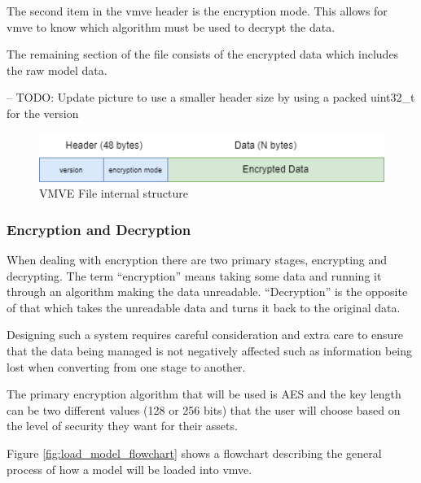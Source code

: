 \documentclass[11pt]{article}
\begin{document}
The second item in the \gls*{vmve} header is the encryption mode. This allows for
\gls*{vmve} to know which algorithm must be used to decrypt the data.

The remaining section of the file consists of the encrypted data which includes
the raw model data.

-- TODO: Update picture to use a smaller header size by using a packed uint32\_t for the version

\begin{figure}[ht]
  \centering
  \includegraphics[width=\textwidth]{images/vmve_file_structure.png}
  \caption{VMVE File internal structure}
  \label{fig:vmve_file_structure}
\end{figure}


\subsubsection{Encryption and Decryption}
When dealing with encryption there are two primary stages, encrypting and
decrypting. The term ``encryption'' means taking some data and running it
through an algorithm making the data unreadable. ``Decryption'' is the opposite
of that which takes the unreadable data and turns it back to the original data.

Designing such a system requires careful consideration and extra care to ensure
that the data being managed is not negatively affected such as information being
lost when converting from one stage to another.

The primary encryption algorithm that will be used is AES and the key length can
be two different values (128 or 256 bits) that the user will choose based on the
level of security they want for their assets.

Figure \ref{fig:load_model_flowchart} shows a flowchart describing the general
process of how a model will be loaded into \gls*{vmve}.
\end{document}
